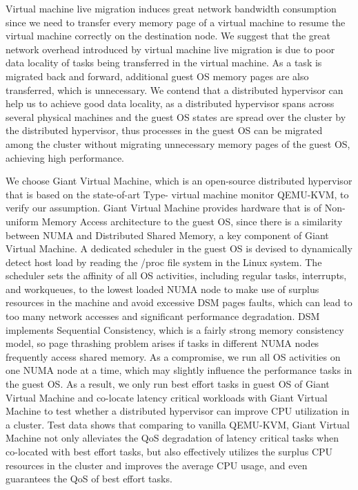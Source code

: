 \begin{bigabstract}
Virtual machine live migration induces great network bandwidth consumption since we need to transfer every memory page of a virtual machine to resume the virtual machine correctly on the destination node. We suggest that the great network overhead introduced by virtual machine live migration is due to poor data locality of tasks being transferred in the virtual machine. As a task is migrated back and forward, additional guest OS memory pages are also transferred, which is unnecessary. We contend that a distributed hypervisor can help us to achieve good data locality, as a distributed hypervisor spans across several physical machines and the guest OS states are spread over the cluster by the distributed hypervisor, thus processes in the guest OS can be migrated among the cluster without migrating unnecessary memory pages of the guest OS, achieving high performance. 

We choose Giant Virtual Machine, which is an open-source distributed hypervisor that is based on the state-of-art Type-\uppercase\expandafter{} virtual machine monitor QEMU-KVM, to verify our assumption. Giant Virtual Machine provides hardware that is of Non-uniform Memory Access architecture to the guest OS, since there is a similarity between NUMA and Distributed Shared Memory, a key component of Giant Virtual Machine. A dedicated scheduler in the guest OS is devised to dynamically detect host load by reading the /proc file system in the Linux system. The scheduler sets the affinity of all OS activities, including regular tasks, interrupts, and workqueues, to the lowest loaded NUMA node to make use of surplus resources in the machine and avoid excessive DSM pages faults, which can lead to too many network accesses and significant performance degradation. DSM implements Sequential Consistency, which is a fairly strong memory consistency model, so page thrashing problem arises if tasks in different NUMA nodes frequently access shared memory. As a compromise, we run all OS activities on one NUMA node at a time, which may slightly influence the performance tasks in the guest OS. As a result, we only run best effort tasks in guest OS of Giant Virtual Machine and co-locate latency critical workloads with Giant Virtual Machine to test whether a distributed hypervisor can improve CPU utilization in a cluster. Test data shows that comparing to vanilla QEMU-KVM, Giant Virtual Machine not only alleviates the QoS degradation of latency critical tasks when co-located with best effort tasks, but also effectively utilizes the surplus CPU resources in the cluster and improves the average CPU usage, and even guarantees the QoS of best effort tasks.


\end{bigabstract}

